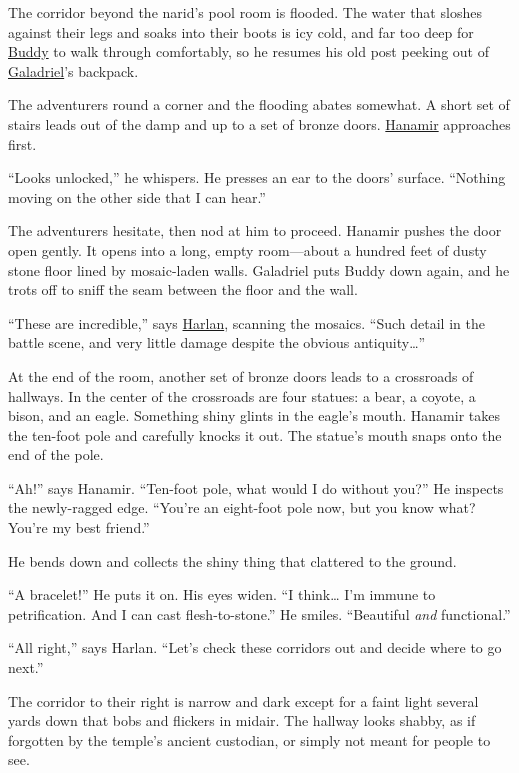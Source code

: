 \documentclass[smalldemyvopaper,11pt,twoside,onecolumn,openright,extrafontsizes]{memoir}
\begin{document}
The corridor beyond the narid's pool room is flooded. The water that
sloshes against their legs and soaks into their boots is icy cold, and
far too deep for \href{/characters/buddy/}{Buddy} to walk through
comfortably, so he resumes his old post peeking out of
\href{/characters/galadriel/}{Galadriel}'s backpack.

The adventurers round a corner and the flooding abates somewhat. A short
set of stairs leads out of the damp and up to a set of bronze doors.
\href{/characters/hanamir/}{Hanamir} approaches first.

``Looks unlocked,'' he whispers. He presses an ear to the doors'
surface. ``Nothing moving on the other side that I can hear.''

The adventurers hesitate, then nod at him to proceed. Hanamir pushes the
door open gently. It opens into a long, empty room---about a hundred
feet of dusty stone floor lined by mosaic-laden walls. Galadriel puts
Buddy down again, and he trots off to sniff the seam between the floor
and the wall.

``These are incredible,'' says \href{/characters/harlan/}{Harlan},
scanning the mosaics. ``Such detail in the battle scene, and very little
damage despite the obvious antiquity\ldots{}''

At the end of the room, another set of bronze doors leads to a
crossroads of hallways. In the center of the crossroads are four
statues: a bear, a coyote, a bison, and an eagle. Something shiny glints
in the eagle's mouth. Hanamir takes the ten-foot pole and carefully
knocks it out. The statue's mouth snaps onto the end of the pole.

``Ah!'' says Hanamir. ``Ten-foot pole, what would I do without you?'' He
inspects the newly-ragged edge. ``You're an eight-foot pole now, but you
know what? You're my best friend.''

He bends down and collects the shiny thing that clattered to the ground.

``A bracelet!'' He puts it on. His eyes widen. ``I think\ldots{} I'm
immune to petrification. And I can cast flesh-to-stone.'' He smiles.
``Beautiful \emph{and} functional.''

``All right,'' says Harlan. ``Let's check these corridors out and decide
where to go next.''

The corridor to their right is narrow and dark except for a faint light
several yards down that bobs and flickers in midair. The hallway looks
shabby, as if forgotten by the temple's ancient custodian, or simply not
meant for people to see.
\end{document}
